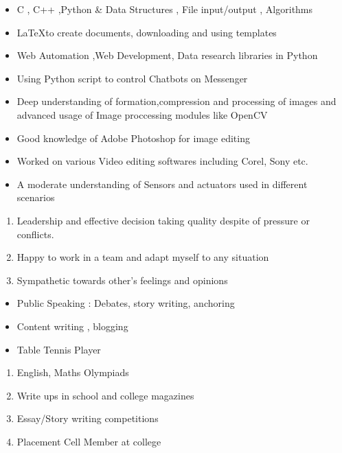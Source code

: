 \documentclass{article}
\begin{document}
	
			\begin{itemize}
			\color{black}	\item C , C++ ,Python \& Data Structures , File input/output , Algorithms
			\color{black}	\item  \LaTeX to create documents, downloading and using templates
			\color{black} \item Web Automation ,Web Development, Data research libraries in Python
			\color{black} \item Using Python script to control  Chatbots on Messenger
			\color{black} \item Deep understanding of formation,compression and processing of images and advanced usage of Image proccessing modules like OpenCV
			\color{black} \item Good knowledge of Adobe Photoshop for image editing
			\color{black} \item Worked on various Video editing softwares including Corel, Sony etc.
			\color{black} \item A moderate understanding of Sensors and actuators used in different scenarios
			
		\end{itemize}
	\begin{enumerate}
		\LARGE
			\color{black}	\item Leadership and effective decision taking quality despite of pressure or conflicts.
		\item  Happy to work in a team and adapt myself to any situation
		\item Sympathetic towards other's feelings and opinions
	\end{enumerate}
\begin{itemize}
	\LARGE
	\color{black}	\item Public Speaking : Debates, story writing, anchoring
	\item Content writing , blogging
	\item Table Tennis Player
\end{itemize}
\begin{enumerate}
	\LARGE
	\color{black}	\item English, Maths Olympiads
	\item Write ups in school and college magazines
	\item Essay/Story writing competitions
	\item Placement Cell Member at college 
	
\end{enumerate}		

	
\end{document}
